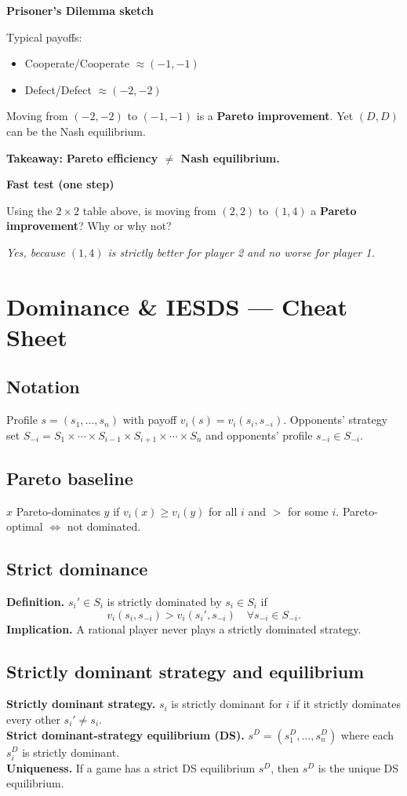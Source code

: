 \documentclass[11pt]{article}
\begin{document}
\begin{multicols}{2}
\textbf{Prisoner’s Dilemma sketch}

Typical payoffs:
\begin{itemize}
  \item Cooperate/Cooperate $\approx (-1,-1)$
  \item Defect/Defect $\approx (-2,-2)$
\end{itemize}
Moving from $(-2,-2)$ to $(-1,-1)$ is a \textbf{Pareto improvement}. Yet $(D,D)$ can be the Nash equilibrium.

\textbf{Takeaway:} \textbf{Pareto efficiency $\neq$ Nash equilibrium.}

\textbf{Fast test (one step)}

Using the $2\times2$ table above, is moving from $(2,2)$ to $(1,4)$ a \textbf{Pareto improvement}? Why or why not?

\emph{Yes, because $(1,4)$ is strictly better for player 2 and no worse for player 1.}


\newpage
\section*{Dominance \& IESDS — Cheat Sheet}

\subsection*{Notation}
Profile $s=(s_1,\dots,s_n)$ with payoff $v_i(s)=v_i(s_i,s_{-i})$. Opponents’ strategy set $S_{-i}=S_1\times\cdots\times S_{i-1}\times S_{i+1}\times\cdots\times S_n$ and opponents’ profile $s_{-i}\in S_{-i}$.

\subsection*{Pareto baseline}
$x$ Pareto-dominates $y$ if $v_i(x)\ge v_i(y)$ for all $i$ and $>$ for some $i$. Pareto-optimal $\iff$ not dominated.

\subsection*{Strict dominance}
\textbf{Definition.} $s_i'\in S_i$ is strictly dominated by $s_i\in S_i$ if
\[
v_i(s_i,s_{-i})>v_i(s_i',s_{-i})\quad \forall s_{-i}\in S_{-i}.
\]
\textbf{Implication.} A rational player never plays a strictly dominated strategy.

\subsection*{Strictly dominant strategy and equilibrium}
\textbf{Strictly dominant strategy.} $s_i$ is strictly dominant for $i$ if it strictly dominates every other $s_i'\neq s_i$.\\
\textbf{Strict dominant-strategy equilibrium (DS).} $s^D=(s^D_1,\dots,s^D_n)$ where each $s^D_i$ is strictly dominant.\\
\textbf{Uniqueness.} If a game has a strict DS equilibrium $s^D$, then $s^D$ is the unique DS equilibrium.


\end{multicols}
\end{document}
